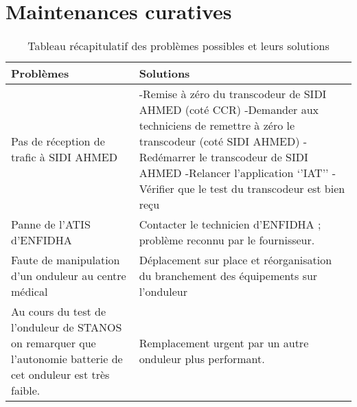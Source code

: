 \section*{Maintenances curatives}

\begin{table}[!h]
\begin{center}
\begin{tabular}{|p{8cm}|p{8cm}|}
  \hline
     \textbf{Problèmes} & \textbf{Solutions} \\
   \hline
   Pas de réception de trafic à SIDI AHMED &  -Remise à zéro du transcodeur de SIDI AHMED (coté CCR) -Demander aux techniciens de remettre à zéro le  transcodeur (coté SIDI AHMED) -Redémarrer le transcodeur de SIDI AHMED       -Relancer l’application ‘’IAT’’ -Vérifier que le test du transcodeur est bien reçu  \\ \hline
Panne de l’ATIS d’ENFIDHA & Contacter le technicien d’ENFIDHA ; problème reconnu par le fournisseur. \\ \hline
Faute de manipulation d’un onduleur au centre médical  & Déplacement sur place et réorganisation du branchement des équipements sur l’onduleur \\ \hline
Au cours du test de l’onduleur de STANOS on remarquer que l’autonomie batterie de cet onduleur est très faible. & Remplacement urgent par un autre onduleur plus performant. \\ \hline

  \end{tabular}
\end{center}
\caption{Tableau récapitulatif des problèmes possibles et leurs solutions}
\end{table}